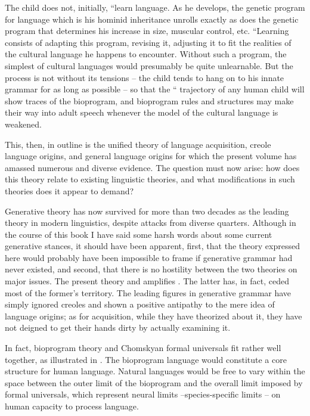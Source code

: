 The child does not, initially, ``learn language. As he develops, the genetic program for language which is his hominid inheritance unrolls exactly as does the genetic program that determines his increase
in size, muscular control, etc. ``Learning consists of adapting this program, revising it, adjusting it to fit the realities of the cultural language he happens to encounter. Without such a program, the simplest of cultural languages would presumably be quite unlearnable. But the  process is not without its tensions -- the child tends to hang on to his innate grammar for as long as possible -- so that the `` trajectory of any human child will show traces of the bioprogram, and bioprogram rules and structures may make their way into adult speech whenever the model of the cultural language is weakened.

This, then, in outline is the unified theory of language acquisition, creole language origins, and general language origins for which the present volume has amassed numerous and diverse  evidence. The question must now arise: how does this theory relate to existing linguistic theories, and what modifications in such theories does it appear to demand?

Generative theory has now survived for more than two decades as the leading theory in modern linguistics, despite attacks from diverse quarters. Although in the course of this book I have said some harsh words about some current generative stances, it should have been apparent, first, that the theory expressed here would probably have been impossible to frame if generative grammar had never existed, and second, that there is no hostility between the two theories on major issues. The present theory  and amplifies . The latter has, in fact, ceded most of the former's territory. The leading figures in generative grammar have simply ignored creoles and shown a positive antipathy to the mere idea of language origins; as for acquisition, while they have theorized about it, they have not deigned to get their hands dirty by actually examining it.

In fact, bioprogram theory and Chomskyan formal universals fit rather well together, as illustrated in . %
The bioprogram language would constitute a core structure for human language. Natural languages would be free to vary within the space between the outer limit of the bioprogram and the overall limit
imposed by formal universals, which represent neural limits --species-specific limits -- on human capacity to process language.

